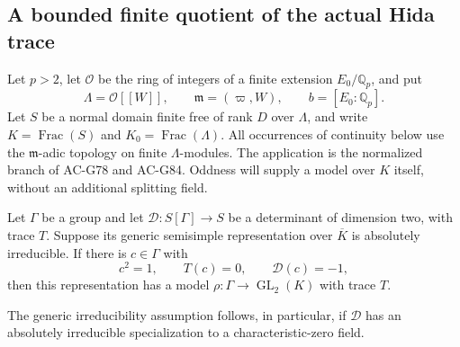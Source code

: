 \subsection{A bounded finite quotient of the actual Hida trace}
\label{sec:cubic-finite-trace-quotient}

Let \(p>2\), let \(\mathcal O\) be the ring of integers of a finite
extension \(E_0/\mathbb Q_p\), and put
\[
 \Lambda=\mathcal O[[W]],\qquad
 \mathfrak m=(\varpi,W),\qquad b=[E_0:\mathbb Q_p].
\]
Let \(S\) be a normal domain finite free of rank \(D\) over \(\Lambda\),
and write \(K=\operatorname{Frac}(S)\) and
\(K_0=\operatorname{Frac}(\Lambda)\).
All occurrences of continuity below use the \(\mathfrak m\)-adic
topology on finite \(\Lambda\)-modules.
The application is the normalized branch of AC-G78 and AC-G84.
Oddness will supply a model over \(K\) itself, without an additional
splitting field.

\begin{lemma}
\label{lem:G85-split}
Let \(\Gamma\) be a group and let \(\mathscr D:S[\Gamma]\to S\)
be a determinant of dimension two, with trace \(T\).
Suppose its generic semisimple representation over \(\overline K\)
is absolutely irreducible.
If there is \(c\in\Gamma\) with
\[
 c^2=1,\qquad T(c)=0,\qquad \mathscr D(c)=-1,
 \tag{G85.1}
\]
then this representation has a model
\(\rho:\Gamma\to\operatorname{GL}_2(K)\) with trace \(T\).

The generic irreducibility assumption follows, in particular, if
\(\mathscr D\) has an absolutely irreducible specialization to a
characteristic-zero field.
\end{lemma}

